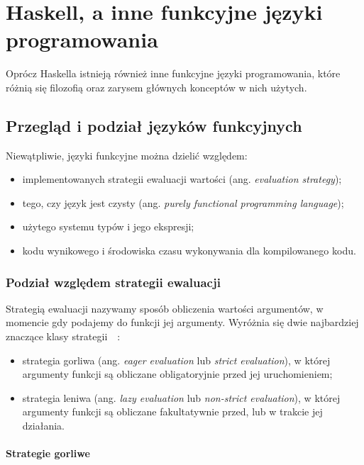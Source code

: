 \documentclass[../praca.tex]{subfiles}
\begin{document}
\chapter{Haskell, a inne funkcyjne języki programowania}

Oprócz Haskella istnieją również inne funkcyjne języki programowania, które 
różnią się filozofią oraz zarysem głównych konceptów w nich użytych.

\section{Przegląd i podział języków funkcyjnych}

Niewątpliwie, języki funkcyjne można dzielić względem:
\begin{itemize}
  \item implementowanych strategii ewaluacji wartości (ang. \emph{evaluation strategy});
  \item tego, czy język jest czysty (ang. \emph{purely functional programming language});
  \item użytego systemu typów i jego ekspresji;
  \item kodu wynikowego i środowiska czasu wykonywania dla kompilowanego kodu. 
\end{itemize}

\subsection{Podział względem strategii ewaluacji}

Strategią ewaluacji nazywamy sposób obliczenia wartości argumentów, w momencie gdy
podajemy do funkcji jej argumenty. Wyróżnia się dwie najbardziej znaczące
klasy strategii~\cite{Abelson:SICP}~\cite{Pierce:TPL}:

\begin{itemize}
  \item strategia gorliwa (ang. \emph{eager evaluation} lub \emph{strict evaluation}),
    w której argumenty funkcji są obliczane obligatoryjnie 
    przed jej uruchomieniem;
  \item strategia leniwa (ang. \emph{lazy evaluation} lub \emph{non-strict evaluation}),
    w której argumenty funkcji są obliczane fakultatywnie przed, lub w trakcie jej 
    działania.
\end{itemize}

\subsubsection{Strategie gorliwe}
\end{document}
